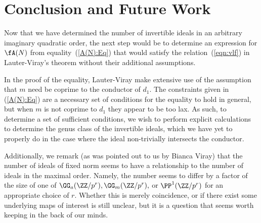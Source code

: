 \documentclass[11pt, proquest]{uwthesis}
\begin{document}
\section{Conclusion and Future Work}

Now that we have determined the number of invertible ideals in an arbitrary imaginary quadratic order, the next step would be to determine an expression for $\fA(N)$ from equality~(\ref{A(N):Eq}) that would satisfy the relation~(\ref{eqn:vlf}) in Lauter-Viray's theorem without their additional assumptions.

In the proof of the equality, Lauter-Viray make extensive use of the assumption that $m$ need be coprime to the conductor of $d_1$. The constraints given in (\ref{A(N):Eq}) are a necessary set of conditions for the equality to hold in general, but when $m$ is not coprime to $d_1$ they appear to be too lax.
As such, to determine a set of sufficient conditions, we wish to perform explicit calculations to determine the genus class of the invertible ideals, which we have yet to properly do in the case where the ideal non-trivially intersects the conductor.

Additionally, we remark (as was pointed out to us by Bianca Viray) that the number of ideals of fixed norm seems to have a relationship to the number of ideals in the maximal order. Namely, the number seems to differ by a factor of the size of one of $\GG_a(\ZZ/p^{r}),\GG_m(\ZZ/p^{r}),$ or $\PP^1(\ZZ/p^r)$ for an appropriate choice of $r$. Whether this is merely coincidence, or if there exist some underlying maps of interest is still unclear, but it is a question that seems worth keeping in the back of our minds.


\end{document}
